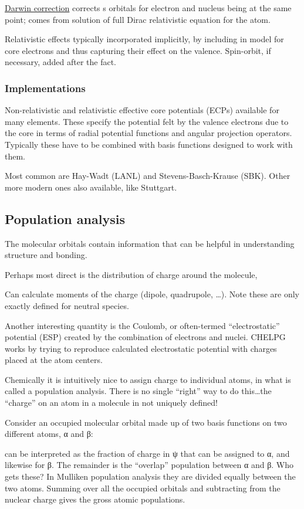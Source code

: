 \documentclass[11pt]{article}
\begin{document}
\uline{Darwin correction} corrects s orbitals for electron and nucleus being at the same point; comes from solution of full Dirac relativistic equation for the atom.

Relativistic effects typically incorporated implicitly, by including in model for core electrons and thus capturing their effect on the valence.  Spin-orbit, if necessary, added after the fact.
\subsubsection{Implementations}
\label{sec:orgf939d08}
Non-relativistic and relativistic effective core potentials (ECPs) available for many elements.  These specify the potential felt by the valence electrons due to the core in terms of radial potential functions and angular projection operators.  Typically these have to be combined with basis functions designed to work with them.

Most common are Hay-Wadt (LANL) and Stevens-Basch-Krause (SBK).  Other more modern ones also available, like Stuttgart.
\subsection{Population analysis}
\label{sec:org23635cf}
The molecular orbitals contain information that can be helpful in understanding structure and bonding.  

Perhaps most direct is the distribution of charge around the molecule, 


Can calculate moments of the charge (dipole, quadrupole, \ldots).  Note these are only exactly defined for neutral species.

Another interesting quantity is the Coulomb, or often-termed ``electrostatic'' potential (ESP) created by the combination of electrons and nuclei.  CHELPG works by trying to reproduce calculated electrostatic potential with charges placed at the atom centers.

Chemically it is intuitively nice to assign charge to individual atoms, in what is called a population analysis.  There is no single ``right'' way to do this\ldots the ``charge'' on an atom in a molecule in not uniquely defined!

Consider an occupied molecular orbital made up of two basis functions on two different atoms, α and β:

can be interpreted as the fraction of charge in ψ that can be assigned to α, and likewise  for β.  The remainder is the “overlap” population between α and β.  Who gets these?  In Mulliken population analysis they are divided equally between the two atoms.  Summing over all the occupied orbitals and subtracting from the nuclear charge gives the gross atomic populations.
\end{document}
